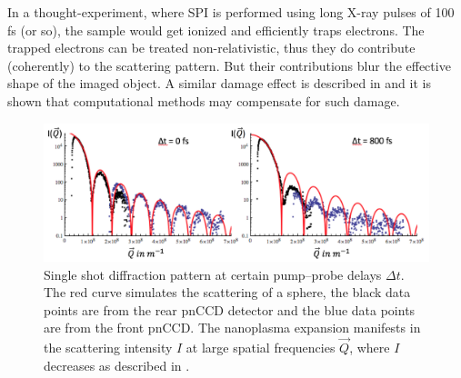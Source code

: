 In a thought-experiment, where SPI is performed using long X-ray pulses of 100 fs (or so), the sample would get ionized and efficiently traps electrons. The trapped electrons can be treated non-relativistic, thus they do contribute (coherently) to the scattering pattern. But their contributions blur the effective shape of the imaged object. A similar damage effect is described in \citep{Quiney-2010-NatPhys} and it is shown that computational methods may compensate for such damage.\\
\begin{figure}
	\centering
		\includegraphics[width=1.0\textwidth]{images/results/Xe-diff-pattern.png}
	\caption[Single-shot diffraction pattern of Xe-cluster at varying time delays]{Single shot diffraction pattern at certain pump--probe delays $\Delta t$. The red curve simulates the scattering of a sphere, the black data points are from the rear pnCCD detector and the blue data points are from the front pnCCD. The nanoplasma expansion manifests in the scattering intensity $I$ at large spatial frequencies $\vec{Q}$, where $I$ decreases as described in \citep{Gorkhover-2016-NatPho}.}
	\label{fig:Xe-only-diff-pattern}
\end{figure}
